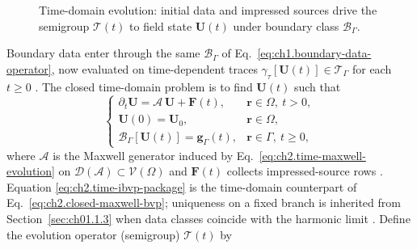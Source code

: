 \begin{figure}[t]
\centering
{}
\caption{Time-domain evolution: initial data and impressed sources drive the
semigroup \(\mathcal{T}(t)\) to field state \(\mathbf{U}(t)\) under boundary class
\(\mathcal{B}_\Gamma\).}
\label{fig:ch2.time-evolution-measurement chain}
\end{figure}
Boundary data enter through the same 
\(\mathcal{B}_\Gamma\) of Eq.~\eqref{eq:ch1.boundary-data-operator}, now evaluated
on time-dependent traces \(\gamma_\tau[\mathbf{U}(t)]\in\mathcal{T}_\Gamma\) for
each \(t\ge 0\) \cite{stratton1941}. The closed time-domain problem
is to find \(\mathbf{U}(t)\) such that
\begin{equation}
\label{eq:ch2.time-ibvp-package}
\begin{cases}
\partial_t\mathbf{U}=\mathcal{A}\,\mathbf{U}+\mathbf{F}(t), & \mathbf{r}\in\Omega,\ t>0,\\
\mathbf{U}(0)=\mathbf{U}_0, & \mathbf{r}\in\Omega,\\
\mathcal{B}_\Gamma[\mathbf{U}(t)]=\mathbf{g}_\Gamma(t), & \mathbf{r}\in\Gamma,\ t\ge 0,
\end{cases}
\end{equation}
where \(\mathcal{A}\) is the Maxwell generator induced by
Eq.~\eqref{eq:ch2.time-maxwell-evolution} on
\(\mathcal{D}(\mathcal{A})\subset\mathcal{V}(\Omega)\) and
\(\mathbf{F}(t)\) collects impressed-source rows \cite{stratton1941}. Equation
\eqref{eq:ch2.time-ibvp-package} is the time-domain counterpart of
Eq.~\eqref{eq:ch2.closed-maxwell-bvp}; uniqueness on a fixed branch is inherited
from Section~\ref{sec:ch01.1.3} when data classes coincide with the harmonic limit
\cite{stratton1941}. Define the evolution operator (semigroup) \(\mathcal{T}(t)\) by
